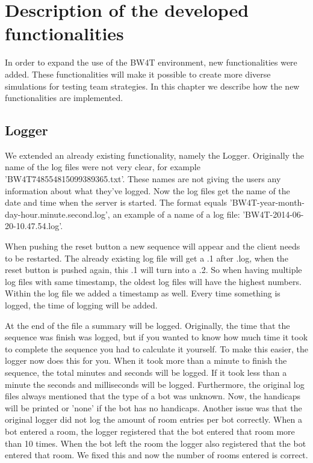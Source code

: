 \chapter{Description of the developed functionalities}
In order to expand the use of the BW4T environment, new functionalities were added. These functionalities will make it possible to create more diverse simulations for testing team strategies. In this chapter we describe how the new functionalities are implemented.

\section{Logger}

We extended an already existing functionality, namely the Logger. Originally the name of the log files were not very clear, for example 'BW4T748554815099389365.txt’. These names are not giving the users any information about what they’ve logged. Now the log files get the name of the date and time when the server is started. The format equals 'BW4T-year-month-day-hour.minute.second.log’, an example of a name of a log file: 'BW4T-2014-06-20-10.47.54.log’.

When pushing the reset button a new sequence will appear and the client needs to be restarted. The already existing log file will get a .1 after .log, when the reset button is pushed again, this .1 will turn into a .2. So when having multiple log files with same timestamp, the oldest log files will have the highest numbers. Within the log file we added a timestamp as well. Every time something is logged, the time of logging will be added.

At the end of the file a summary will be logged. Originally, the time that the sequence was finish was logged, but if you wanted to know how much time it took to complete the sequence you had to calculate it yourself. To make this easier, the logger now does this for you. When it took more than a minute to finish the sequence, the total minutes and seconds will be logged. If it took less than a minute the seconds and milliseconds will be logged. Furthermore, the original log files always mentioned that the type of a bot was unknown. Now, the handicaps will be printed or 'none' if the bot has no handicaps. Another issue was that the original logger did not log the amount of room entries per bot correctly. When a bot entered a room, the logger registered that the bot entered that room more than 10 times. When the bot left the room the logger also registered that the bot entered that room. We fixed this and now the number of rooms entered is correct.

